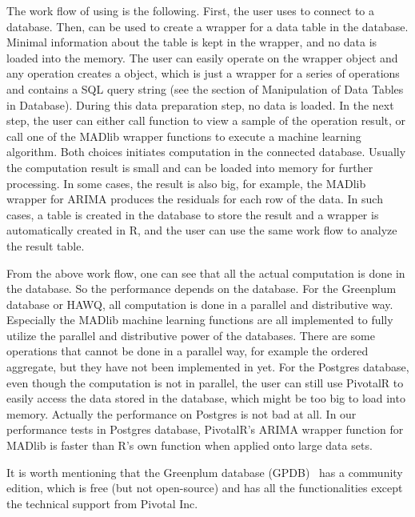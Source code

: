 The work flow of using  is the following. First, the
user uses  to connect to a database. Then,
 can be used to create a wrapper for a data
table
in the database. Minimal information about the table is kept in the
wrapper, and no data is loaded into the memory. The user can easily
operate on the  wrapper object and any operation
creates a
 object, which is just a wrapper for a series of
operations and contains a SQL query string (see the section of
Manipulation of Data Tables in Database). During this data preparation
step, no data is loaded. In the next step, the user can either call
 function to view a sample of the operation result, or
call one of the MADlib wrapper functions to execute a machine learning
algorithm. Both choices initiates computation in the connected
database. Usually the computation result is small and can be loaded
into memory for further processing. In some cases, the result is also
big,
for example, the MADlib wrapper for ARIMA produces the residuals for
each row of the data. In such cases, a table is created in the
database to store the result and a wrapper is automatically created in
R, and the user can use the same work flow to analyze the result
table.

From the above work flow, one can see that all the actual computation
is done in the database. So the performance depends on the
database. For the Greenplum database or HAWQ, all computation is done
in a parallel and distributive way. Especially the MADlib machine
learning functions are all implemented to fully utilize the parallel
and distributive power of the databases. There are some operations
that cannot be done in a parallel way, for example the ordered
aggregate, but they have not been implemented in 
yet. For the Postgres database, even though the computation is not in
parallel, the user can still use PivotalR to easily access the data
stored in the database, which might be too big to load into
memory. Actually the performance on Postgres is not bad at all. In our
performance tests
in Postgres database, PivotalR's ARIMA wrapper function for MADlib is
faster than R's own  function when applied onto large
data
sets.

It is worth mentioning that the Greenplum database (GPDB)~\citep{gpdb}
has a community edition, which is free (but not open-source) and has
all the functionalities except the technical support from Pivotal Inc.

